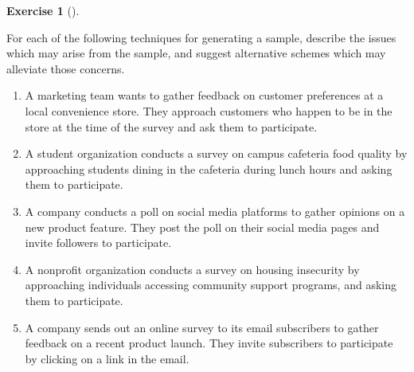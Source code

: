 \documentclass[
  letterpaper,
  DIV=11,
  numbers=noendperiod]{scrreprt}
\providecommand{\tightlist}{%
  \setlength{\itemsep}{0pt}\setlength{\parskip}{0pt}}\usepackage{longtable,booktabs,array}
\theoremstyle{definition}
\newtheorem{exercise}{Exercise}[chapter]
\theoremstyle{definition}
\theoremstyle{definition}
\theoremstyle{remark}
\begin{document}
\begin{exercise}[]\protect\hypertarget{exr-10.16}{}\label{exr-10.16}

For each of the following techniques for generating a sample, describe
the issues which may arise from the sample, and suggest alternative
schemes which may alleviate those concerns.

\begin{enumerate}
\def\labelenumi{\alph{enumi}.}
\tightlist
\item
  A marketing team wants to gather feedback on customer preferences at a
  local convenience store. They approach customers who happen to be in
  the store at the time of the survey and ask them to participate.
\item
  A student organization conducts a survey on campus cafeteria food
  quality by approaching students dining in the cafeteria during lunch
  hours and asking them to participate.
\item
  A company conducts a poll on social media platforms to gather opinions
  on a new product feature. They post the poll on their social media
  pages and invite followers to participate.
\item
  A nonprofit organization conducts a survey on housing insecurity by
  approaching individuals accessing community support programs, and
  asking them to participate.
\item
  A company sends out an online survey to its email subscribers to
  gather feedback on a recent product launch. They invite subscribers to
  participate by clicking on a link in the email.
\end{enumerate}

\end{exercise}
\end{document}
